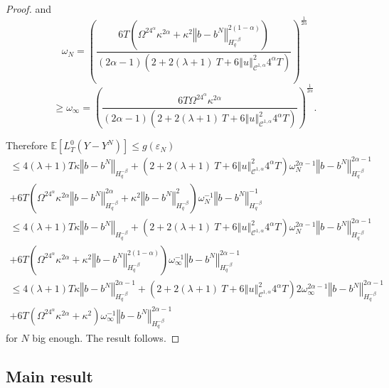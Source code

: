 \documentclass[11pt]{enstaPRE}
\newcommand{\norme}[1]{\left\Vert #1\right\Vert}
\newcommand{\E}{\mathbb{E}}
\begin{document}
\begin{proof}
    and \begin{equation*}
    \omega_N = \left(\frac{6T\left(\Omega^24^{\alpha}\kappa^{2\alpha} +\kappa^2\norme{b-b^N}_{H^{-\beta}_{q}}^{2(1-\alpha)}\right)}{(2\alpha-1)\left(2 + 2(\lambda + 1)\ T + 6\norme{u}_{\mathcal{C}^{1,\alpha}}^2 4^{\alpha}T\right)}\right)^{\frac{1}{2\alpha}}
    \end{equation*}
    \begin{equation*}
    \geq\omega_\infty=\left(\frac{6T\Omega^24^{\alpha}\kappa^{2\alpha} }{(2\alpha-1)\left(2 + 2(\lambda + 1)\ T + 6\norme{u}_{\mathcal{C}^{1,\alpha}}^2 4^{\alpha}T\right)}\right)^{\frac{1}{2\alpha}}.
    \end{equation*}
    
    Therefore $
    \E\left[L^0_T(Y-Y^N)\right]\leq g(\varepsilon_N)
    $
    \begin{multline*}
    \leq 4(\lambda + 1)T\kappa\norme{b-b^N}_{H^{-\beta}_{q}} + \left(2 + 2(\lambda + 1)\ T + 6\norme{u}_{\mathcal{C}^{1,\alpha}}^2 4^{\alpha}T\right) \omega_N^{2\alpha-1}\norme{b-b^N}_{H^{-\beta}_{q}}^{2\alpha-1} \\ + 6T\left(\Omega^24^{\alpha}\kappa^{2\alpha} \norme{b-b^N}_{H^{-\beta}_q}^{2\alpha}+\kappa^2\norme{b-b^N}_{H^{-\beta}_{q}}^2\right)\omega_N^{-1}\norme{b-b^N}_{H^{-\beta}_{q}}^{-1}
    \end{multline*} 
    \begin{multline*}
    \leq 4(\lambda + 1)T\kappa\norme{b-b^N}_{H^{-\beta}_{q}} + \left(2 + 2(\lambda + 1)\ T + 6\norme{u}_{\mathcal{C}^{1,\alpha}}^2 4^{\alpha}T\right) \omega_N^{2\alpha-1}\norme{b-b^N}_{H^{-\beta}_{q}}^{2\alpha-1} \\ + 6T\left(\Omega^24^{\alpha}\kappa^{2\alpha} +\kappa^2\norme{b-b^N}_{H^{-\beta}_{q}}^{2(1-\alpha)}\right)\omega_\infty^{-1}\norme{b-b^N}_{H^{-\beta}_{q}}^{2\alpha-1}
    \end{multline*}   
    \begin{multline*}
    \leq 4(\lambda + 1)T\kappa\norme{b-b^N}_{H^{-\beta}_{q}}^{2\alpha-1} + \left(2 + 2(\lambda + 1)\ T + 6\norme{u}_{\mathcal{C}^{1,\alpha}}^2 4^{\alpha}T\right)2 \omega_\infty^{2\alpha-1}\norme{b-b^N}_{H^{-\beta}_{q}}^{2\alpha-1} \\ + 6T\left(\Omega^24^{\alpha}\kappa^{2\alpha} +\kappa^2\right)\omega_\infty^{-1}\norme{b-b^N}_{H^{-\beta}_{q}}^{2\alpha-1}
    \end{multline*}
    for $N$ big enough. The result follows.
\end{proof}

\subsection{Main result}
\end{document}
